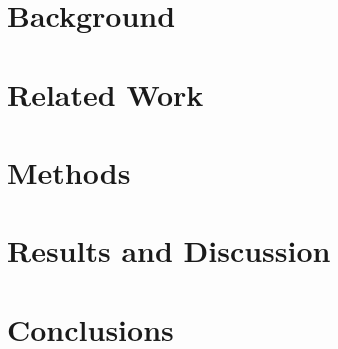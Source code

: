 \section*{Background}
 
\section*{Related Work}
 
\section*{Methods} 
 
\section*{Results and Discussion}
 
\section*{Conclusions}
 
